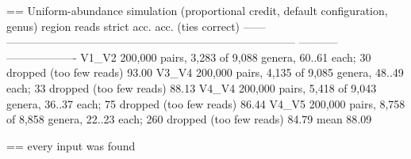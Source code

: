== Uniform-abundance simulation (proportional credit, default configuration, genus)
  region                                                                           reads  strict acc.  acc. (ties correct)
  ------  ------------------------------------------------------------------------------  -----------  -------------------
  V1_V2    200,000 pairs, 3,283 of 9,088 genera, 60..61 each; 30 dropped (too few reads)       93.00%
  V3_V4    200,000 pairs, 4,135 of 9,085 genera, 48..49 each; 33 dropped (too few reads)       88.13%
  V4_V4    200,000 pairs, 5,418 of 9,043 genera, 36..37 each; 75 dropped (too few reads)       86.44%
  V4_V5   200,000 pairs, 8,758 of 8,858 genera, 22..23 each; 260 dropped (too few reads)       84.79%
  mean                                                                                         88.09%

== every input was found

